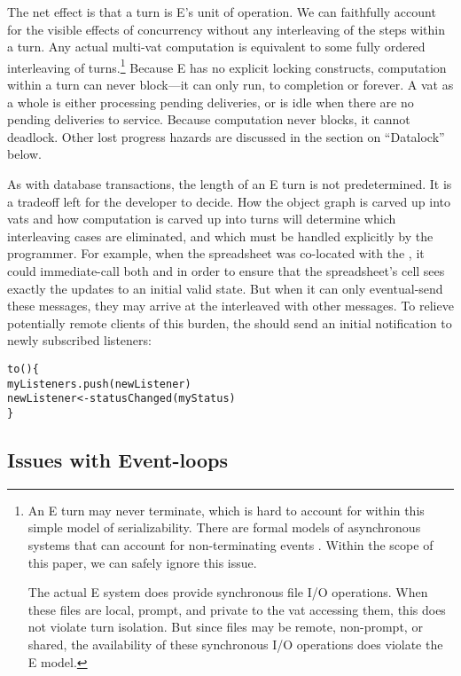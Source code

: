\documentclass{llncs}
\begin{document}
The net effect is that a turn is E's unit of operation. We can
faithfully account for the visible effects of concurrency without any
interleaving of the steps within a turn. Any actual multi-vat
computation is equivalent to some fully ordered interleaving of
turns.\footnote{
%
An E turn may never terminate, which is hard to account for within
this simple model of serializability. There are formal models of
asynchronous systems that can account for non-terminating events
\cite{chandy:snapshots}. Within the scope of this paper, we can safely
ignore this issue.

The actual E system does provide synchronous file I/O operations. When
these files are local, prompt, and private to the vat accessing them,
this does not violate turn isolation. But since files may be remote,
non-prompt, or shared, the availability of these synchronous I/O
operations does violate the E model.}
%
Because E has no explicit locking constructs, computation within a
turn can never block---it can only run, to completion or forever. A
vat as a whole is either processing pending deliveries, or is idle
when there are no pending deliveries to service. Because computation
never blocks, it cannot deadlock.  Other lost progress hazards are
discussed in the section on ``Datalock'' below.

As with database transactions, the length of an E turn is not
predetermined. It is a tradeoff left for the developer to decide. How
the object graph is carved up into vats and how computation is carved
up into turns will determine which interleaving cases are eliminated,
and which must be handled explicitly by the programmer. For example,
when the spreadsheet was co-located with the , it
could immediate-call both  and  in
order to ensure that the spreadsheet's cell sees exactly the updates
to an initial valid state. But when it can only eventual-send these
messages, they may arrive at the  interleaved with
other messages. To relieve potentially remote clients of this burden,
the  should send an initial notification to newly
subscribed listeners:
%
\begin{alltt}
    to () \{
        myListeners.push(newListener)
        newListener <- statusChanged(myStatus)
    \}
\end{alltt}
%

\subsection{Issues with Event-loops}
\end{document}

